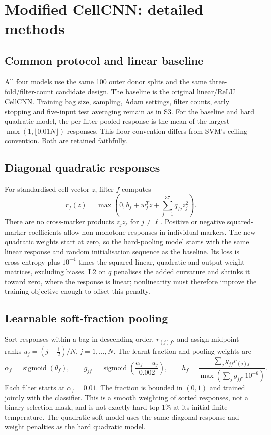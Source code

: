 \documentclass[11pt,a4paper]{article}
\begin{document}
\clearpage
\section{Modified CellCNN: detailed methods}
\subsection{Common protocol and linear baseline}
All four models use the same 100 outer donor splits and the same three-fold/filter-count candidate design. The baseline is the original linear/ReLU CellCNN. Training bag size, sampling, Adam settings, filter counts, early stopping and five-input test averaging remain as in S3. For the baseline and hard quadratic model, the per-filter pooled response is the mean of the largest $\max(1,\lfloor0.01N\rfloor)$ responses. This floor convention differs from SVM's ceiling convention. Both are retained faithfully.

\subsection{Diagonal quadratic responses}
For standardised cell vector $z$, filter $f$ computes
\[
r_f(z)=\max\left(0,b_f+w_f^Tz+\sum_{j=1}^{37}q_{fj}z_j^2\right).
\]
There are no cross-marker products $z_jz_\ell$ for $j\ne\ell$. Positive or negative squared-marker coefficients allow non-monotone responses in individual markers. The new quadratic weights start at zero, so the hard-pooling model starts with the same linear response and random initialisation sequence as the baseline. Its loss is cross-entropy plus $10^{-4}$ times the squared linear, quadratic and output weight matrices, excluding biases. L2 on $q$ penalises the added curvature and shrinks it toward zero, where the response is linear; nonlinearity must therefore improve the training objective enough to offset this penalty.

\subsection{Learnable soft-fraction pooling}
Sort responses within a bag in descending order, $r_{(j)f}$, and assign midpoint ranks $u_j=(j-\tfrac12)/N$, $j=1,\ldots,N$. The learnt fraction and pooling weights are
\[
\alpha_f=\operatorname{sigmoid}(\theta_f),\qquad
g_{jf}=\operatorname{sigmoid}\left(\frac{\alpha_f-u_j}{0.002}\right),\qquad
h_f=\frac{\sum_jg_{jf}r_{(j)f}}{\max(\sum_jg_{jf},10^{-6})}.
\]
Each filter starts at $\alpha_f=0.01$. The fraction is bounded in $(0,1)$ and trained jointly with the classifier. This is a smooth weighting of sorted responses, not a binary selection mask, and is not exactly hard top-1\% at its initial finite temperature. The quadratic soft model uses the same diagonal response and weight penalties as the hard quadratic model.
\end{document}
